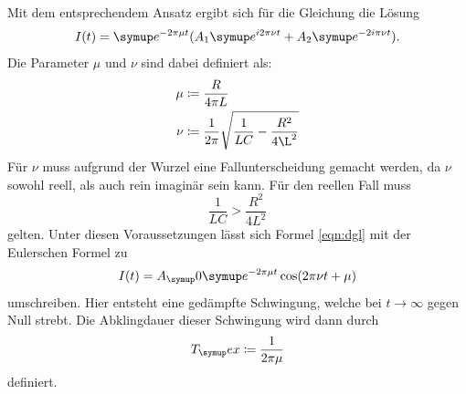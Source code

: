 Mit dem entsprechendem Ansatz ergibt sich für die Gleichung die Lösung
\begin{equation}
  I(t)=\su{e}^{-2\pi\mu t}(A_1\su{e}^{i2\pi\nu t} + A_2\su{e}^{-2i\pi\nu t}).
  \label{eqn:dgl}
\end{equation}
Die Parameter $\mu$ und $\nu$ sind dabei definiert als:
\begin{align*}
  \mu &\coloneqq\frac{R}{4\pi L} \\
  \nu &\coloneqq\frac{1}{2\pi}\sqrt{\frac{1}{LC}-\frac{R^2}{4\L^2}}
\end{align*}
Für $\nu$ muss aufgrund der Wurzel eine Fallunterscheidung gemacht werden, da
$\nu$ sowohl reell, als auch rein imaginär sein kann.
Für den reellen Fall muss
\begin{equation*}
  \frac{1}{LC} > \frac{R^2}{4L^2}
\end{equation*}
gelten. Unter diesen Voraussetzungen lässt sich Formel \eqref{eqn:dgl} mit der
Eulerschen Formel zu
\begin{equation}
  I(t)=A_\su{0}\su{e}^{-2\pi\mu t}\cos(2\pi\nu t+\mu)
  \label{eqn:einh}
\end{equation}
umschreiben. Hier entsteht eine gedämpfte Schwingung, welche bei
$t\rightarrow\infty$
gegen Null strebt. Die Abklingdauer dieser Schwingung wird dann durch
\begin{equation}
  T_\su{ex}\coloneqq\frac{1}{2\pi\mu}
\end{equation}
definiert.

